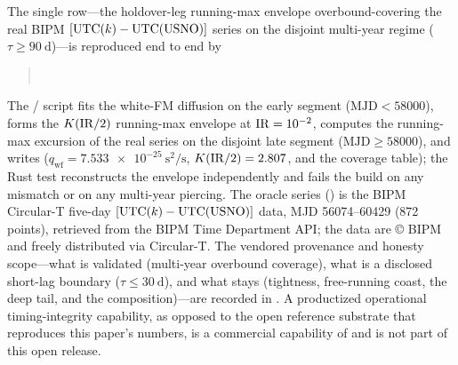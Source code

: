 The single \Validated{} row---the holdover-leg running-max envelope
overbound-covering the real BIPM $[\mathrm{UTC}(k){}-\mathrm{UTC(USNO)}]$ series on the
disjoint multi-year regime ($\tau\ge\SI{90}{\day}$)---is reproduced end to end by
\begin{quote}
  \\
\end{quote}
The / script fits the white-FM diffusion on the early
segment ($\mathrm{MJD}<58000$), forms the $K(\mathrm{IR}/2)$ running-max envelope at
$\mathrm{IR}=\num{e-2}$, computes the running-max excursion of the real series on the
disjoint late segment ($\mathrm{MJD}\ge58000$), and writes
 ($q_{\mathrm{wf}}=\SI{7.533e-25}{\square\second\per\second}$,
$K(\mathrm{IR}/2)=2.807$, and the coverage table); the Rust test reconstructs the
envelope independently and fails the build on any mismatch or on any multi-year
piercing. The oracle series
() is the BIPM Circular-T five-day
$[\mathrm{UTC}(k){}-\mathrm{UTC(USNO)}]$ data, MJD 56074--60429 (872 points), retrieved from
the BIPM Time Department  API; the data are © BIPM and freely
distributed via Circular-T. The vendored provenance and honesty scope---what is
validated (multi-year overbound coverage), what is a disclosed \Modelled{} short-lag
boundary ($\tau\le\SI{30}{\day}$), and what stays \Modelled{} (tightness,
free-running coast, the deep tail, and the composition)---are recorded in
. A productized operational timing-integrity
capability, as opposed to the open reference substrate that reproduces this paper's
numbers, is a commercial capability of  and is not part of this
open release.
